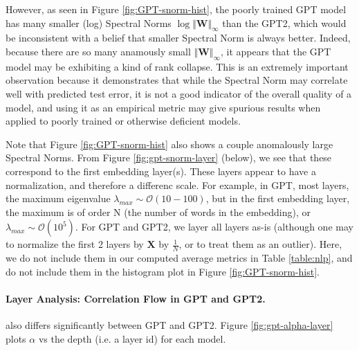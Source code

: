 However, as seen in Figure \ref{fig:GPT-snorm-hist},
 the poorly trained GPT model has many smaller (log) Spectral Norms $\log\Vert\mathbf{W}\Vert_{\infty}$
than the GPT2, which would be inconsistent with a belief that smaller Spectral Norm is always better.
Indeed, because there are so many anamously small $\Vert\mathbf{W}\Vert_{\infty}$,
it appears that the GPT model may be exhibiting a kind of rank collapse.
This is an extremely important observation because it demonstrates that while the Spectral Norm
may correlate well with predicted test error, it is not a good indicator of the overall quality of a model,
and using it as an empirical metric may give spurious results when applied to poorly trained
or otherwise deficient models.  


Note that Figure \ref{fig:GPT-snorm-hist} also shows a couple anomalously  large Spectral Norms.
From Figure \ref{fig:gpt-snorm-layer} (below), we see that these correspond to the first embedding layer(s).
These layers appear to have a normalization, and therefore a differenc scale.
For example, in GPT, most layers, the maximum eigenvalue $\lambda_{max}\sim\mathcal{O}(10-100)$,
but in the first embedding layer, the maximum is of order N (the number of words in the embedding), or
 $\lambda_{max}\sim\mathcal{O}(10^{5})$.  For GPT and GPT2, we layer all layers as-is (although one may to normalize
the first 2 layers by  $\mathbf{X}$ by $\frac{1}{N}$, or to treat them as an outlier).
Here, we do not include them in our computed average metrics in Table \ref{table:nlp},
and do not include them in the histogram plot in Figure \ref{fig:GPT-snorm-hist}.


\paragraph{Layer Analysis: Correlation Flow in GPT and GPT2.} 

also differs significantly between GPT and GPT2.
Figure \ref{fig:gpt-alpha-layer} plots $\alpha$ vs the depth (i.e. a layer id) for each model.


